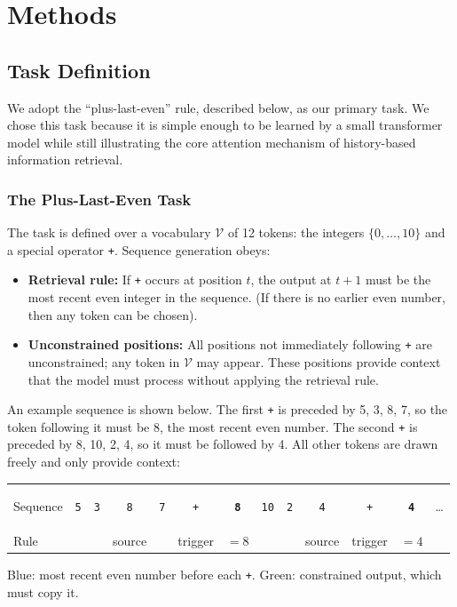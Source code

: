 \documentclass[
  11pt,
  a4paper,
]{article}
\providecommand{\tightlist}{%
  \setlength{\itemsep}{0pt}\setlength{\parskip}{0pt}}
\renewcommand{\tightlist}{}
\renewcommand{\arraystretch}{1.12}
\begin{document}
\section{Methods}\label{methods}

\subsection{Task Definition}\label{task-definition}

We adopt the ``plus-last-even'' rule, described below, as our primary
task. We chose this task because it is simple enough to be learned by a
small transformer model while still illustrating the core attention
mechanism of history-based information retrieval.

\subsubsection{The Plus-Last-Even Task}\label{the-plus-last-even-task}

The task is defined over a vocabulary \(\mathcal{V}\) of 12 tokens: the
integers \(\{0, \ldots, 10\}\) and a special operator \texttt{+}.
Sequence generation obeys:

\begin{itemize}
\tightlist
\item
  \textbf{Retrieval rule:} If \texttt{+} occurs at position \(t\), the
  output at \(t+1\) must be the most recent even integer in the
  sequence. (If there is no earlier even number, then any token can be
  chosen).
\item
  \textbf{Unconstrained positions:} All positions not immediately
  following \texttt{+} are unconstrained; any token in \(\mathcal{V}\)
  may appear. These positions provide context that the model must
  process without applying the retrieval rule.
\end{itemize}

An example sequence is shown below. The first \texttt{+} is preceded by
5, 3, 8, 7, so the token following it must be 8, the most recent even
number. The second \texttt{+} is preceded by 8, 10, 2, 4, so it must be
followed by 4. All other tokens are drawn freely and only provide
context:

\begin{center}
\renewcommand{\arraystretch}{1.3}
\setlength{\tabcolsep}{5pt}
\newcommand{\src}[1]{\colorbox{blue!15}{\strut\texttt{#1}}}
\newcommand{\tgt}[1]{\colorbox{green!25}{\strut\texttt{\textbf{#1}}}}
\begin{tabular}{l*{12}{c}}
\toprule
Sequence & \texttt{5} & \texttt{3} & \src{8} & \texttt{7} & \texttt{+} & \tgt{8}
         & \texttt{10} & \texttt{2} & \src{4} & \texttt{+} & \tgt{4} & \ldots \\
Rule     & & & {\small source} & & {\small trigger} & {\small $=8$}
         & & & {\small source} & {\small trigger} & {\small $=4$} & \\
\bottomrule
\end{tabular}

\smallskip
{\small Blue: most recent even number before each \texttt{+}.
Green: constrained output, which must copy it.}
\end{center}
\end{document}
